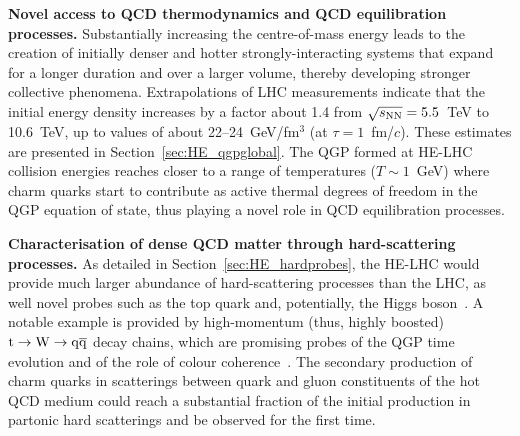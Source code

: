 \documentclass[../report.tex]{subfiles}
\begin{document}
\noindent
	{\bf Novel access to QCD thermodynamics and QCD equilibration processes.}
	Substantially increasing the centre-of-mass energy leads to the creation of initially denser and hotter strongly-interacting systems that expand for a longer duration and over a larger volume, thereby
	developing stronger collective phenomena. 
Extrapolations of LHC measurements indicate that the initial energy density increases by a factor about 1.4 from $\sqrt{s_{\rm NN}} = 5.5$~TeV to 10.6~TeV, up to values of about 22--24~GeV/fm$^3$ (at $\tau=1$~fm/$c$).
These estimates are presented in Section~\ref{sec:HE_qgpglobal}.
The QGP formed at HE-LHC collision energies reaches closer to a range of temperatures ($T\sim 1$~GeV) where charm quarks start to contribute as active thermal degrees of freedom in the QGP equation of state, thus playing a novel role in QCD equilibration processes. 

\noindent
	 {\bf Characterisation of dense QCD matter through hard-scattering processes.}
As detailed in Section~\ref{sec:HE_hardprobes}, the HE-LHC would provide much larger abundance of hard-scattering processes than the LHC, as well novel probes such as the top quark and, potentially, the Higgs boson~\cite{Apolinario:2017sob,dEnterria:2015mgr,dEnterria:2017jyt}. 
A notable example is provided by high-momentum (thus, highly boosted) $\rm t \to W \to q\overline q$ decay chains, which are promising probes of the QGP time evolution and of the role of colour coherence~\cite{Apolinario:2017sob}. 
The secondary production of charm quarks in scatterings between quark and gluon constituents of the hot QCD medium could reach a substantial fraction of the initial production in partonic hard scatterings and be observed for the first time. 
\end{document}
